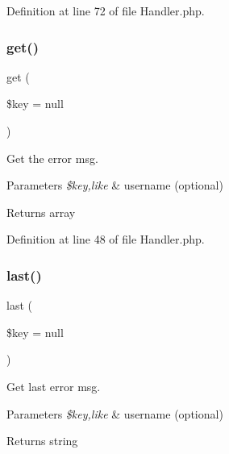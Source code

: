 Definition at line 72 of file Handler.\+php.

\mbox{\label{class_zest_1_1_auth_1_1_handler_a35cbcd6b22933128eaaa6ded4e8d9aef}} 
\subsubsection{\texorpdfstring{get()}{get()}}
{\footnotesize\ttfamily get (\begin{DoxyParamCaption}\item[{}]{\$key = {\ttfamily null} }\end{DoxyParamCaption})}

Get the error msg.


\begin{DoxyParams}{Parameters}
{\em \$key,like} & username (optional)\\
\hline
\end{DoxyParams}
\begin{DoxyReturn}{Returns}
array 
\end{DoxyReturn}


Definition at line 48 of file Handler.\+php.

\mbox{\label{class_zest_1_1_auth_1_1_handler_a360a957582276d15bd28200d17d3ed33}} 
\subsubsection{\texorpdfstring{last()}{last()}}
{\footnotesize\ttfamily last (\begin{DoxyParamCaption}\item[{}]{\$key = {\ttfamily null} }\end{DoxyParamCaption})}

Get last error msg.


\begin{DoxyParams}{Parameters}
{\em \$key,like} & username (optional)\\
\hline
\end{DoxyParams}
\begin{DoxyReturn}{Returns}
string 
\end{DoxyReturn}


